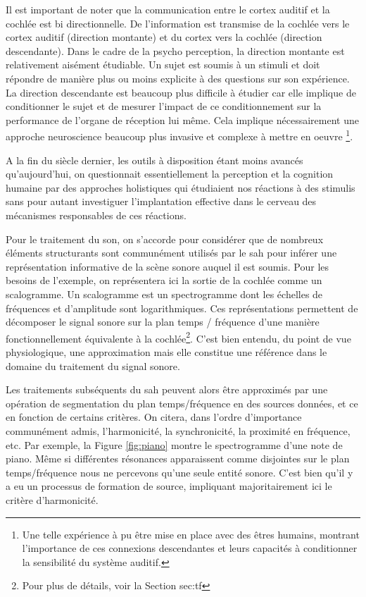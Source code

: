 Il est important de noter que la communication entre le cortex auditif et la cochlée est bi directionnelle. De l'information est transmise de la cochlée vers le cortex auditif (direction montante) et du cortex vers la cochlée (direction descendante). Dans le cadre de la psycho perception, la direction montante est relativement aisément étudiable. Un sujet est soumis à un stimuli et doit répondre de manière plus ou moins explicite à des questions sur son expérience. La direction descendante est beaucoup plus difficile à étudier car elle implique de conditionner le sujet et de mesurer l'impact de ce conditionnement sur la performance de l'organe de réception lui même. Cela implique nécessairement une approche \og neuroscience \fg beaucoup plus invasive et complexe à mettre en oeuvre \footnote{Une telle expérience à pu être mise en place avec des êtres humains, montrant l'importance de ces connexions descendantes et leurs capacités à conditionner la sensibilité du système auditif\cite{mesgarani2012selective}.}.

A la fin du siècle dernier, les outils à disposition étant moins avancés qu'aujourd'hui, on questionnait essentiellement la perception et la cognition humaine par des approches \og holistiques \fg qui étudiaient nos réactions à des stimulis sans pour autant investiguer l'implantation effective dans le cerveau des mécanismes responsables de ces réactions.

Pour le traitement du son, on s'accorde pour considérer que de nombreux éléments structurants sont communément utilisés par le sah pour inférer une représentation informative de la scène sonore auquel il est soumis. Pour les besoins de l'exemple, on représentera ici la sortie de la cochlée comme un scalogramme. Un scalogramme est un spectrogramme dont les échelles de fréquences et d'amplitude sont logarithmiques. Ces représentations permettent de décomposer le signal sonore sur la plan temps / fréquence d'une manière fonctionnellement équivalente à la cochlée\footnote{Pour plus de détails, voir la Section \refname{sec:tf}}. C'est bien entendu, du point de vue physiologique, une approximation\cite{lyon2017human} mais elle constitue une référence dans le domaine du traitement du signal sonore.

Les traitements subséquents  du sah peuvent alors être approximés par une opération de segmentation du plan temps/fréquence en des sources données, et ce en fonction de certains critères.  On citera, dans l'ordre d'importance communément admis, l'harmonicité, la synchronicité, la proximité en fréquence, etc. Par exemple, la Figure \ref{fig:piano} montre le spectrogramme d'une note de piano. Même si différentes résonances apparaissent comme disjointes sur le plan temps/fréquence nous ne percevons qu'une seule entité sonore. C'est bien qu'il y a eu un processus de formation de source, impliquant majoritairement ici le critère d'harmonicité.

